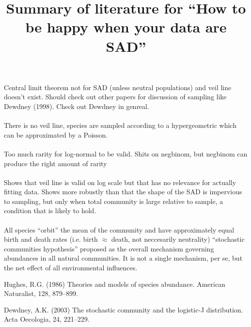 \documentclass[12pt]{article}
\title{Summary of literature for ``How to be happy when your data are SAD''}
\author{}
\begin{document}
\maketitle

\paragraph{\cite{williamson2005}}
Central limit theorem not for SAD (unless neutral populations) and
veil line doesn't exist.  Should check out other papers for discussion
of sampling like Dewdney (1998).  Check out Dewdney in genreal.


\paragraph{\cite{dewdney1998}}
There is no veil line, species are sampled according to a
hypergeometric which can be approximated by a Poisson.

\paragraph{\cite{dewdney2000}}
Too much rarity for log-normal to be valid. Shits on negbinom, but
negbinom can produce the right amount of rarity

\paragraph{\cite{chisholm2007}}
Shows that veil line is valid on log scale but that has no relevance
for actually fitting data.  Shows more robustly than
\citep{dewdney1998} that the shape of the SAD is impervious to
sampling, but only when total community is large relative to sample, a
condition that is likely to hold.

\paragraph{\cite{dewdney2003}}
All species ``orbit'' the mean of the community and have approximately
equal birth and death rates (i.e. birth $\approx$ death, not
neccesarily neutrality) ``stochastic communities hypothesis'' proposed
as the overall mechanism governing abundances in all natural
communities. It is not a single mechanism, per se, but the net effect
of all environmental influences.

Hughes, R.G. (1986) Theories and models of species abundance. American Naturalist, 128, 879–899.



Dewdney, A.K. (2003) The stochastic community and the logistic-J distribution. Acta Oecologia, 24, 221–229.



\end{document}
